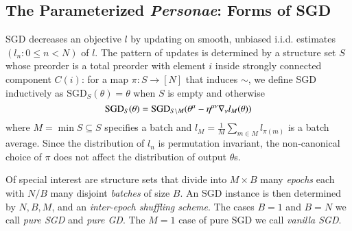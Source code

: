 \documentclass{article}
\newcommand{\SGD}{\text{\textnormal{SGD}}}
\begin{document}
\subsection{The Parameterized \emph{Personae}: Forms of SGD}
    SGD decreases an objective $l$ by updating on smooth, unbiased i.i.d.
    estimates $(l_n: 0\leq n<N)$ of $l$.  The pattern of updates is determined
    by a structure set $S$ whose preorder is a total preorder with element $i$ 
    inside strongly connected component $C(i)$: for a map
    $\pi:S\to [N]$ that induces $\sim$, we define SGD inductively as
    $\text{SGD}_{S}(\theta) = \theta$ when $S$ is empty and otherwise
    $$
        \SGD_S(\theta) =
            \SGD_{S\setminus M}(\theta^\mu - \eta^{\mu\nu} \nabla_\nu l_{M}(\theta))
    $$
    where $M = \min S \subseteq S$ specifies a batch and $l_M =
    \frac{1}{M} \sum_{m\in M} l_{\pi(m)}$ is a batch average.  Since the
    distribution of $l_n$ is permutation invariant, the non-canonical choice
    of $\pi$ does not affect the distribution of output $\theta$s.

    Of special interest are structure sets that divide into $M\times B$ many
    \emph{epochs} each with $N/B$ many disjoint \emph{batches} of size $B$.  An
    SGD instance is then determined by $N, B, M$, and an \emph{inter-epoch
    shuffling scheme}.  The cases $B=1$ and $B=N$ we call \emph{pure SGD} and
    \emph{pure GD}.  The $M=1$ case of pure SGD we call \emph{vanilla SGD}.

%
%
       
\end{document}
